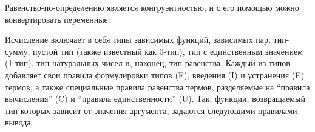 \documentclass[12pt]{article}
\DeclareMathOperator{\type}{type}
\begin{document}
\newpage

Равенство-по-определению является конгруэнтностью, и с его помощью можно
конвертировать переменные:

Исчисление включает в себя типы зависимых функций, зависимых пар, тип-сумму,
пустой тип (также известный как 0-тип), тип с единственным значением (1-тип),
тип натуральных чисел и, наконец, тип равенства. Каждый из типов добавляет свои
правила формулировки типов (F), введения (I) и устранения (E) термов, а также
специальные правила равенства термов, разделяемые на ``правила вычисления'' (C)
и ``правила единственности'' (U). Так, функции, возвращаемый тип которых зависит
от значения аргумента, задаются следующими правилами вывода:
\end{document}
